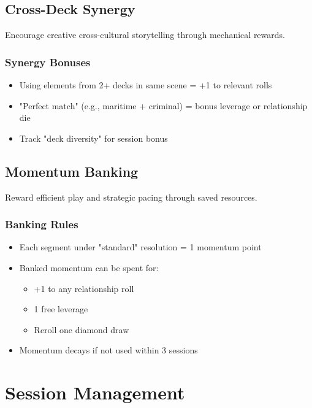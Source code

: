 \subsection{Cross-Deck Synergy}

Encourage creative cross-cultural storytelling through mechanical rewards.

\subsubsection{Synergy Bonuses}

\begin{itemize}
\item Using elements from 2+ decks in same scene = +1 to relevant rolls
\item "Perfect match" (e.g., maritime + criminal) = bonus leverage or relationship die
\item Track "deck diversity" for session bonus
\end{itemize}

\subsection{Momentum Banking}

Reward efficient play and strategic pacing through saved resources.

\subsubsection{Banking Rules}

\begin{itemize}
\item Each segment under "standard" resolution = 1 momentum point
\item Banked momentum can be spent for:
  \begin{itemize}
  \item +1 to any relationship roll
  \item 1 free leverage
  \item Reroll one diamond draw
  \end{itemize}
\item Momentum decays if not used within 3 sessions
\end{itemize}

\section{Session Management}

